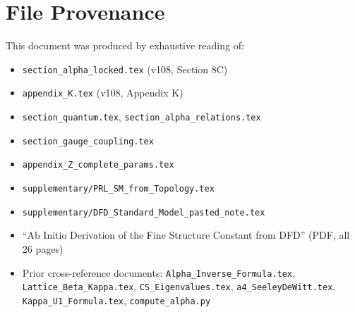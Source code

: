 \documentclass[12pt,a4paper]{article}
\theoremstyle{definition}
\begin{document}
\section*{File Provenance}

This document was produced by exhaustive reading of:
\begin{itemize}
\item \texttt{section\_alpha\_locked.tex} (v108, Section 8C)
\item \texttt{appendix\_K.tex} (v108, Appendix K)
\item \texttt{section\_quantum.tex}, \texttt{section\_alpha\_relations.tex}
\item \texttt{section\_gauge\_coupling.tex}
\item \texttt{appendix\_Z\_complete\_params.tex}
\item \texttt{supplementary/PRL\_SM\_from\_Topology.tex}
\item \texttt{supplementary/DFD\_Standard\_Model\_pasted\_note.tex}
\item ``Ab Initio Derivation of the Fine Structure Constant from DFD'' (PDF, all 26 pages)
\item Prior cross-reference documents:
  \texttt{Alpha\_Inverse\_Formula.tex},
  \texttt{Lattice\_Beta\_Kappa.tex},
  \texttt{CS\_Eigenvalues.tex},
  \texttt{a4\_SeeleyDeWitt.tex},
  \texttt{Kappa\_U1\_Formula.tex},
  \texttt{compute\_alpha.py}
\end{itemize}
\end{document}
